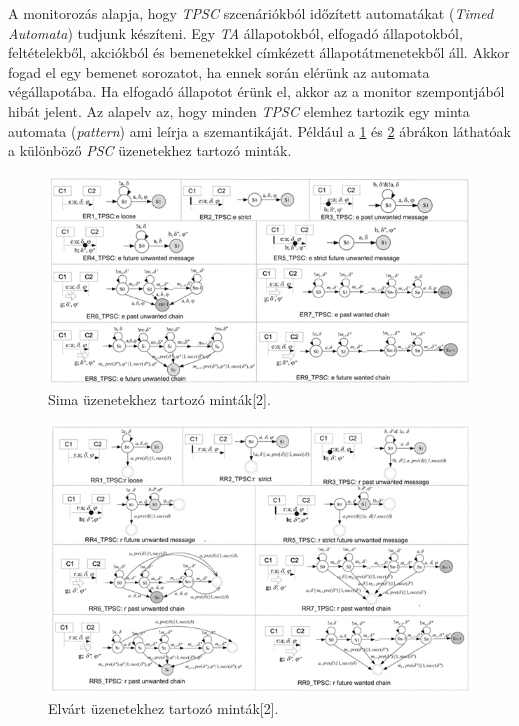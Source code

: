 A monitorozás alapja, hogy \textit{TPSC} szcenáriókból időzített automatákat (\textit{Timed Automata}) tudjunk készíteni.
Egy \textit{TA} állapotokból, elfogadó állapotokból, feltételekből, akciókból és bemenetekkel címkézett állapotátmenetekből áll.
Akkor fogad el egy bemenet sorozatot, ha ennek során elérünk az automata végállapotába.
Ha elfogadó állapotot érünk el, akkor az a monitor szempontjából hibát jelent.
Az alapelv az, hogy minden \textit{TPSC} elemhez tartozik egy minta automata (\textit{pattern}) ami leírja a szemantikáját.
Például a \ref{tpsc_sima} és \ref{tpsc_elvárt} ábrákon láthatóak a különböző \textit{PSC} üzenetekhez tartozó minták.

\begin{figure}[!ht]
    \centering
    \includegraphics[width=150mm, keepaspectratio]{figures/5abra.png}
    \caption{Sima üzenetekhez tartozó minták[2].}
    \label{tpsc_sima}
\end{figure}

\begin{figure}[!ht]
    \centering
    \includegraphics[width=150mm, keepaspectratio]{figures/6abra.png}
    \caption{Elvárt üzenetekhez tartozó minták[2].}
    \label{tpsc_elvárt}
\end{figure}


